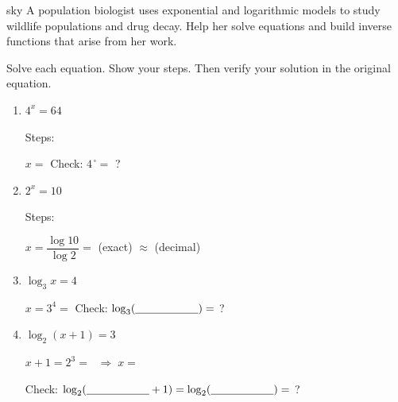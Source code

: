 \documentclass[10pt]{article}
\begin{document}
\namepartnerperiod

\vspace{0.08in}

\begin{scenariobox}{sky}
A population biologist uses exponential and logarithmic models to study wildlife populations
and drug decay. Help her solve equations and build inverse functions that arise from her work.
\end{scenariobox}

\vspace{0.08in}

\begin{tcolorbox}[colback=white, colframe=black!40,
    title=\textbf{Tier R --- Remediate},
    fonttitle=\bfseries, arc=2mm, left=3mm, right=3mm, top=2mm, bottom=2mm]

Solve each equation. Show your steps. Then verify your solution in the original equation.

\begin{enumerate}[leftmargin=1.8em, itemsep=10pt]

\item $4^x = 64$

\vspace{6pt}
Steps: \writeline

$x = $ \blank{2.5cm} \qquad Check: $4^{\,\square} = $ \blank{2cm} \checkmark? \blank{1.2cm}

\item $2^x = 10$

\vspace{6pt}
Steps: \writeline

$x = \dfrac{\log 10}{\log 2} = $ \blank{3cm} (exact) $\approx$ \blank{2cm} (decimal)

\item $\log_3 x = 4$

\vspace{6pt}
$x = 3^4 = $ \blank{2.5cm} \qquad Check: $\log_3(\blank{2cm}) = $ \blank{1.5cm} \checkmark? \blank{1.2cm}

\item $\log_2(x+1) = 3$

\vspace{6pt}
$x + 1 = 2^3 = $ \blank{2cm} $\;\Rightarrow\; x = $ \blank{2.5cm}

Check: $\log_2(\blank{2cm} + 1) = \log_2(\blank{2cm}) = $ \blank{1.5cm} \checkmark? \blank{1.2cm}

\end{enumerate}
\end{tcolorbox}
\end{document}
